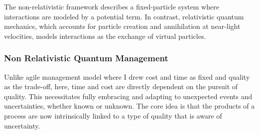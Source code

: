 \documentclass{article}
\begin{document}
The non-relativistic framework describes a fixed-particle system where interactions are modeled by a potential term. In contrast, relativistic quantum mechanics, which accounts for particle creation and annihilation at near-light velocities, models interactions as the exchange of virtual particles.
\subsubsection{Non Relativistic Quantum Management}
Unlike agile management model where I drew cost and time as fixed and quality as the trade-off, here, time and cost are directly dependent on the pursuit of quality. This necessitates fully embracing and adapting to unexpected events and uncertainties, whether known or unknown. The core idea is that the products of a process are now intrinsically linked to a type of quality that is aware of uncertainty.
\end{document}
